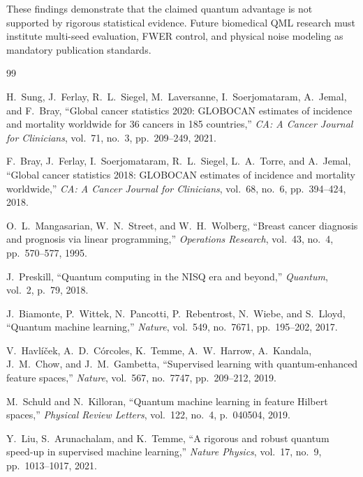 \documentclass[journal,twocolumn]{IEEEtran}
\begin{document}
These findings demonstrate that the claimed quantum advantage is not supported by rigorous statistical evidence. Future biomedical QML research must institute multi-seed evaluation, FWER control, and physical noise modeling as mandatory publication standards.

\begin{thebibliography}{99}

H.~Sung, J.~Ferlay, R.~L.~Siegel, M.~Laversanne, I.~Soerjomataram, A.~Jemal, and F.~Bray,
``Global cancer statistics 2020: GLOBOCAN estimates of incidence and mortality worldwide for 36 cancers in 185 countries,''
\emph{CA: A Cancer Journal for Clinicians}, vol.~71, no.~3, pp.~209--249, 2021.

F.~Bray, J.~Ferlay, I.~Soerjomataram, R.~L.~Siegel, L.~A.~Torre, and A.~Jemal,
``Global cancer statistics 2018: GLOBOCAN estimates of incidence and mortality worldwide,''
\emph{CA: A Cancer Journal for Clinicians}, vol.~68, no.~6, pp.~394--424, 2018.

O.~L.~Mangasarian, W.~N.~Street, and W.~H.~Wolberg,
``Breast cancer diagnosis and prognosis via linear programming,''
\emph{Operations Research}, vol.~43, no.~4, pp.~570--577, 1995.


J.~Preskill,
``Quantum computing in the NISQ era and beyond,''
\emph{Quantum}, vol.~2, p.~79, 2018.

J.~Biamonte, P.~Wittek, N.~Pancotti, P.~Rebentrost, N.~Wiebe, and S.~Lloyd,
``Quantum machine learning,''
\emph{Nature}, vol.~549, no.~7671, pp.~195--202, 2017.

V.~Havl{\'i}{\v c}ek, A.~D.~C{\'o}rcoles, K.~Temme, A.~W.~Harrow, A.~Kandala, J.~M.~Chow, and J.~M.~Gambetta,
``Supervised learning with quantum-enhanced feature spaces,''
\emph{Nature}, vol.~567, no.~7747, pp.~209--212, 2019.

M.~Schuld and N.~Killoran,
``Quantum machine learning in feature Hilbert spaces,''
\emph{Physical Review Letters}, vol.~122, no.~4, p.~040504, 2019.

Y.~Liu, S.~Arunachalam, and K.~Temme,
``A rigorous and robust quantum speed-up in supervised machine learning,''
\emph{Nature Physics}, vol.~17, no.~9, pp.~1013--1017, 2021.


\end{thebibliography}
\end{document}
